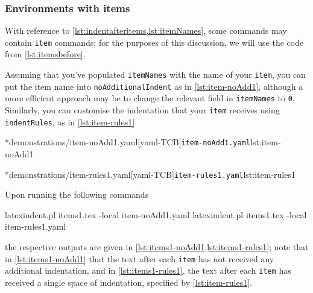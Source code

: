 \subsubsection{Environments with items}
	With reference to \vref{lst:indentafteritems,lst:itemNames}, some commands
	may contain \texttt{item} commands; for the purposes of this discussion,
	we will use the code from \vref{lst:itemsbefore}.

	Assuming that you've populated \texttt{itemNames} with the name of your
	\texttt{item}, you can put the item name into \texttt{noAdditionalIndent}
	as in \cref{lst:item-noAdd1}, although a more efficient approach may be
	to change the relevant field in \texttt{itemNames} to \texttt{0}. Similarly,
	you can customise the indentation that your \texttt{item} receives using
	\texttt{indentRules}, as in \cref{lst:item-rules1}

	\begin{minipage}{.45\textwidth}
		\cmhlistingsfromfile[style=yaml-LST]*{demonstrations/item-noAdd1.yaml}[yaml-TCB]{\texttt{item-noAdd1.yaml}}{lst:item-noAdd1}
	\end{minipage}%
	\hfill
	\begin{minipage}{.45\textwidth}
		\cmhlistingsfromfile[style=yaml-LST]*{demonstrations/item-rules1.yaml}[yaml-TCB]{\texttt{item-rules1.yaml}}{lst:item-rules1}
	\end{minipage}

	Upon running the following commands
	\begin{commandshell}
latexindent.pl items1.tex -local item-noAdd1.yaml  
latexindent.pl items1.tex -local item-rules1.yaml  
\end{commandshell}
	the respective outputs are given in \cref{lst:items1-noAdd1,lst:items1-rules1}; note that in \cref{lst:items1-noAdd1}
	that the text after each \texttt{item} has not received any additional indentation, and in \cref{lst:items1-rules1},
	the text after each \texttt{item} has received a single space of indentation, specified by \cref{lst:item-rules1}.

	\begin{minipage}{.45\textwidth}
	\end{minipage}
	\hfill
	\begin{minipage}{.45\textwidth}
	\end{minipage}

